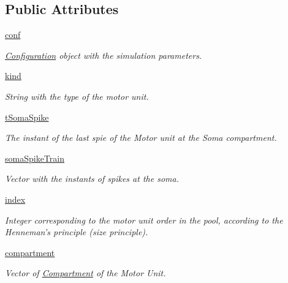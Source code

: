\subsection*{Public Attributes}
\begin{DoxyCompactItemize}
\item 
\hyperlink{class_motor_unit_1_1_motor_unit_a10539f5129881188923f3a3a164d2cba}{conf}
\begin{DoxyCompactList}\small\item\em \hyperlink{namespace_configuration}{Configuration} object with the simulation parameters. \end{DoxyCompactList}\item 
\hyperlink{class_motor_unit_1_1_motor_unit_a08ed5171ba46e0b1ea5bc7d08296c612}{kind}
\begin{DoxyCompactList}\small\item\em String with the type of the motor unit. \end{DoxyCompactList}\item 
\hyperlink{class_motor_unit_1_1_motor_unit_abca82ec2c7312bb475989bb45e82ca28}{t\-Soma\-Spike}
\begin{DoxyCompactList}\small\item\em The instant of the last spie of the Motor unit at the Soma compartment. \end{DoxyCompactList}\item 
\hyperlink{class_motor_unit_1_1_motor_unit_a8c86d98daa6c509e226ab165fa92515f}{soma\-Spike\-Train}
\begin{DoxyCompactList}\small\item\em Vector with the instants of spikes at the soma. \end{DoxyCompactList}\item 
\hyperlink{class_motor_unit_1_1_motor_unit_a4f3205a9273aabb92d425992d91a1848}{index}
\begin{DoxyCompactList}\small\item\em Integer corresponding to the motor unit order in the pool, according to the Henneman's principle (size principle). \end{DoxyCompactList}\item 
\hyperlink{class_motor_unit_1_1_motor_unit_a6d4da7327031b3cb9c7041a4a790e524}{compartment}
\begin{DoxyCompactList}\small\item\em Vector of \hyperlink{namespace_compartment}{Compartment} of the Motor Unit. \end{DoxyCompactList}\item 

\end{DoxyCompactItemize}
